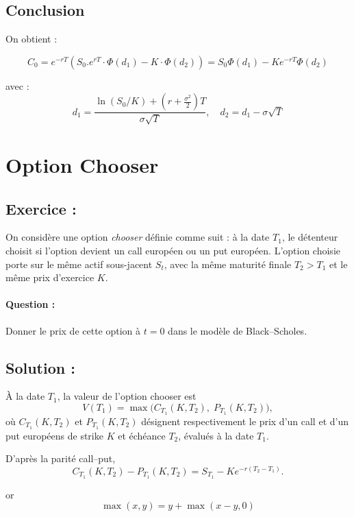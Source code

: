 \subsection*{Conclusion}

On obtient :

\[
C_0 = e^{-rT} \left( S_0. e^{rT} \cdot \Phi(d_1) - K \cdot \Phi(d_2) \right)
= \boxed{ S_0 \Phi(d_1) - K e^{-rT} \Phi(d_2) }
\]

avec :
\[
d_1 = \frac{\ln(S_0/K) + (r + \frac{\sigma^2}{2})T}{\sigma \sqrt{T}}, \quad
d_2 = d_1 - \sigma \sqrt{T}
\]



\section{Option Chooser}

\subsection*{Exercice :}

\begin{exerciseBox}
On considère une option \emph{chooser} définie comme suit : 
à la date $T_1$, le détenteur choisit si l’option devient un call européen ou un put européen.
L’option choisie porte sur le même actif sous-jacent $S_t$, avec la même maturité finale $T_2 > T_1$ et le même prix d’exercice $K$.

\paragraph{Question :} 
Donner le prix de cette option à $t=0$ dans le modèle de Black--Scholes.    
\end{exerciseBox}


\subsection*{Solution :}
À la date $T_1$, la valeur de l’option chooser est
\[
V(T_1) = \max \Big( C_{T_1}(K,T_2), \; P_{T_1}(K,T_2) \Big),
\]
où $C_{T_1}(K,T_2)$ et $P_{T_1}(K,T_2)$ désignent respectivement le prix d’un call et d’un put européens de strike $K$ et échéance $T_2$, évalués à la date $T_1$.

D’après la parité call--put,
\[
C_{T_1}(K,T_2) - P_{T_1}(K,T_2) = S_{T_1} - K e^{-r(T_2-T_1)}.
\]

or 
\[
\max(x,y) = y + \max(x - y , 0)
\]

